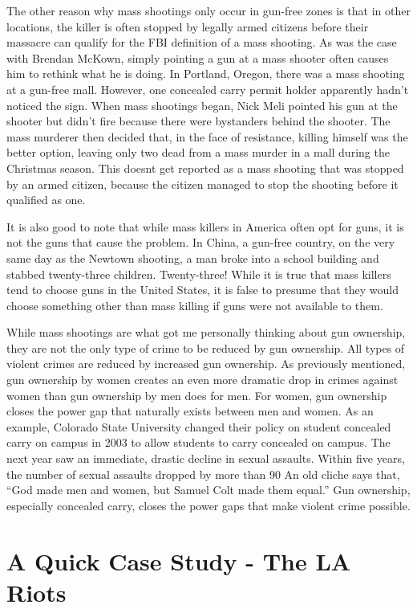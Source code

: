 The other reason why mass shootings only occur in gun-free zones is that
in other locations, the killer is often stopped by legally armed
citizens before their massacre can qualify for the FBI definition of a
mass shooting.  As was the case with Brendan McKown, simply pointing a
gun at a mass shooter often causes him to rethink what he is doing. In
Portland, Oregon, there was a mass shooting at a gun-free mall.
However, one concealed carry permit holder apparently hadn’t noticed
the sign. When mass shootings began, Nick Meli pointed his gun at the
shooter but didn’t fire because there were bystanders behind the
shooter. The mass murderer then decided that, in the face of
resistance, killing himself was the better option, leaving only two
dead from a mass murder in a mall during the Christmas season.  This
doesn{\textquotesingle}t get reported as a mass shooting that was
stopped by an armed citizen, because the citizen managed to stop the
shooting before it qualified as one.

It is also good to note that while mass killers in America often opt for
guns, it is not the guns that cause the problem. In China, a gun-free
country, on the very same day as the Newtown shooting, a man broke into
a school building and stabbed twenty-three children. Twenty-three! 
While it is true that mass killers tend to choose guns in the United
States, it is false to presume that they would choose something other
than mass killing if guns were not available to them.

While mass shootings are what got me personally thinking about gun
ownership, they are not the only type of crime to be reduced by gun
ownership. All types of violent crimes are reduced by increased gun
ownership. As
previously mentioned, gun ownership by women creates an even more
dramatic drop in crimes against women than gun ownership by men does
for men. For women,
gun ownership closes the power gap that naturally exists between men
and women.  
As an example, Colorado State University changed their policy on student concealed 
carry on campus in 2003 to allow students to carry concealed on campus.  The next year saw an immediate, drastic decline
in sexual assaults.  Within five years, the number of sexual assaults
dropped by more than 90%
An old cliche says that, “God made men and women, but
Samuel Colt made them equal.”  Gun ownership, especially concealed
carry, closes the power gaps that make violent crime possible.  

\section{A Quick Case Study - The LA Riots}

